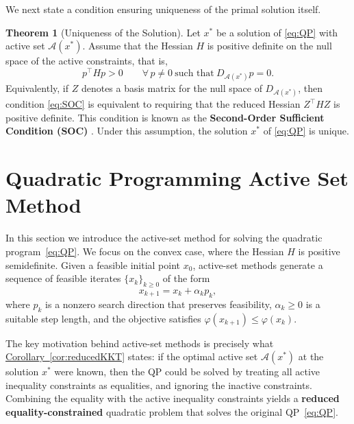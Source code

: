 \documentclass{book}
\theoremstyle{definition}
\newtheorem{theorem}{Theorem}[section]
\newcommand{\corref}[1]{\hyperref[#1]{Corollary~\ref*{#1}}}
\numberwithin{algorithm_}{chapter}
\begin{document}
\bigskip

We next state a condition ensuring uniqueness of the primal solution itself.

\begin{theorem}[Uniqueness of the Solution] \label{th:uniqueSolution}
Let $x^*$ be a solution of \eqref{eq:QP} with active set $\mathcal{A}(x^*)$.  
Assume that the Hessian $H$ is positive definite on the null space of the active constraints, that is,
\begin{equation} \label{eq:SOC}
p^\top H p > 0 \qquad \forall\, p \neq 0 \ \text{such that} \ D_{\mathcal{A}(x^*)} p = 0.
\end{equation}
Equivalently, if $Z$ denotes a basis matrix for the null space of $D_{\mathcal{A}(x^*)}$, then condition \eqref{eq:SOC} is equivalent to requiring that the reduced Hessian $Z^\top H Z$ is positive definite.  
This condition is known as the \textbf{Second-Order Sufficient Condition (SOC)
}.  
Under this assumption, the solution $x^*$ of \eqref{eq:QP} is unique.
\end{theorem}


\section{Quadratic Programming Active Set Method}


In this section we introduce the active-set method \cite{fletcher1971quadratic} for solving the quadratic program~\eqref{eq:QP}. 
We focus on the convex case, where the Hessian \(H\) is positive semidefinite.  
Given a feasible initial point \(x_0\), active-set methods generate a sequence of feasible iterates 
\(\{x_k\}_{k \ge 0}\) of the form
\[
x_{k+1} = x_k + \alpha_k p_k,
\]
where \(p_k\) is a nonzero search direction that preserves feasibility,  
\(\alpha_k \ge 0\) is a suitable step length, and the objective satisfies
\(\varphi(x_{k+1}) \le \varphi(x_k)\).

\bigskip

The key motivation behind active-set methods is precisely what \corref{cor:reducedKKT} states: if the optimal active set $\mathcal{A}(x^*)$ at the solution $x^*$ were known, then the QP could be solved by treating all active inequality constraints as equalities, and ignoring the inactive constraints. Combining the equality with the active inequality constraints yields a \textbf{reduced equality-constrained} quadratic problem that solves the original QP~\eqref{eq:QP}.

\bigskip
\end{document}
